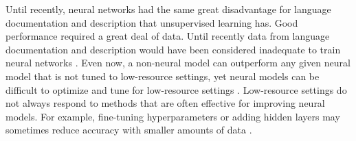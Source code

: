 
Until recently, neural networks had the same great disadvantage for language documentation and description that unsupervised learning has. Good performance required a great deal of data. Until recently data from language documentation and description would have been considered inadequate to train neural networks \citep{duong_natural_2017}.
Even now, a non-neural model can outperform any given neural model that is not tuned to low-resource settings, yet neural models can be difficult to optimize and tune for low-resource settings \citep{popel_training_2018}.
Low-resource settings do not always respond to methods that are often effective for improving neural models. For example, fine-tuning hyperparameters or adding hidden layers may sometimes reduce accuracy with smaller amounts of data \citep{cotterell_conll-sigmorphon_2017,popel_training_2018}. 

